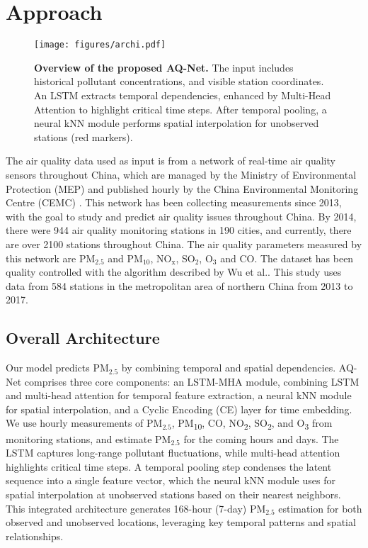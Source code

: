 \section{Approach}

\begin{figure}[t]
\centering
\texttt{[image: figures/archi.pdf]}
\caption{\textbf{Overview of the proposed AQ-Net.} 
The input includes historical pollutant concentrations,  and visible station coordinates. An LSTM extracts temporal dependencies, enhanced by Multi-Head Attention to highlight critical time steps. After temporal pooling, a neural kNN module performs spatial interpolation for unobserved stations (red markers).}
\label{fig:overall_architecture}
\end{figure}

The air quality data used as input is from a network of real-time air quality sensors throughout China, which are managed by the Ministry of Environmental Protection (MEP) and published hourly by the China Environmental Monitoring Centre (CEMC) \cite{SONG2017334}. This network has been collecting measurements since 2013, with the goal to study and predict air quality issues throughout China. By 2014, there were 944 air quality monitoring stations in 190 cities, and currently, there are over 2100 stations throughout China. The air quality parameters measured by this network are PM$_{2.5}$ and PM$_{10}$, NO$_\mathrm{x}$, SO$_2$, O$_3$ and CO. The dataset has been quality controlled with the algorithm described by Wu et al.\cite{Wu2018}. This study uses data from 584 stations in the metropolitan area of northern China from 2013 to 2017.

\subsection{Overall Architecture}
Our model predicts PM\(_{2.5}\) by combining temporal and spatial dependencies. AQ-Net comprises three core components: an LSTM-MHA module, combining LSTM and multi-head attention for temporal feature extraction, a neural kNN module for spatial interpolation, and a Cyclic Encoding (CE) layer for time embedding. We use hourly measurements of PM\(_{2.5}\), PM\textsubscript{10}, CO, NO\textsubscript{2}, SO\textsubscript{2}, and O\textsubscript{3} from monitoring stations, and estimate PM\(_{2.5}\) for the coming hours and days. The LSTM captures long-range pollutant fluctuations, while multi-head attention highlights critical time steps. A temporal pooling step condenses the latent sequence into a single feature vector, which the neural kNN module uses for spatial interpolation at unobserved stations based on their nearest neighbors. This integrated architecture generates 168-hour (7-day) PM\(_{2.5}\) estimation for both observed and unobserved locations, leveraging key temporal patterns and spatial relationships.

